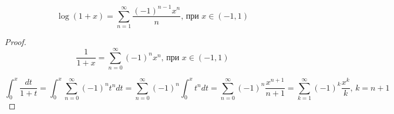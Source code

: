 \begin{theorem}  \thmslashn

    \[\log(1+x) = \sum_{n=1}^{\infty} \frac{(-1)^{n-1}x^{n}}{n} \text{, при } x \in (-1, 1)\]
    
    \begin{proof} \thmslashn
        \[\frac{1}{1+x} =  \sum_{n=0}^{\infty} (-1)^{n}x^{n}\text{, при } x \in (-1, 1)\]
        
        
        \[\int_{0}^{x} \frac{dt}{1 + t} = \int_{0}^{x} \sum_{n=0}^{\infty}(-1)^{n}t^{n} dt = \sum_{n=0}^{\infty}(-1)^{n} \int_{0}^{x} t^{n}dt =  \sum_{n=0}^{\infty}(-1)^{n}\frac{x^{n+1}}{n+1} =  \sum_{k=1}^{\infty}(-1)^{k} \frac{x^{k}}{k} \text {, } k=n+1\]
    \end{proof}
    
\end{theorem}
